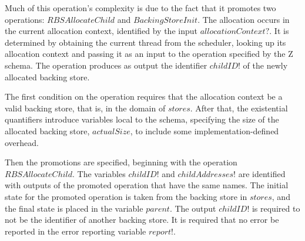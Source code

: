 \documentclass[a4paper,10pt]{report}
\begin{document}
Much of this operation's complexity is due to the fact that it promotes two
operations: $RBSAllocateChild$ and $BackingStoreInit$. The allocation occurs in
the current allocation context, identified by the input $allocationContext?$. It
is determined by obtaining the current thread from the scheduler, looking up its
allocation context and passing it as an input to the operation specified by the
Z schema.  The operation produces as output the identifier $childID!$ of the
newly allocated backing store.

The first condition on the operation requires that the allocation context be a
valid backing store, that is, in the domain of $stores$. After that, the
existential quantifiers introduce variables local to the schema, specifying the
size of the allocated backing store, $actualSize$, to include some
implementation-defined overhead.

Then the promotions are specified, beginning with the operation
$RBSAllocateChild$. The variables $childID!$ and $childAddresses!$ are
identified with outputs of the promoted operation that have the same names. The
initial state for the promoted operation is taken from the backing store in
$stores$, and the final state is placed in the variable $parent$.  The output
$childID!$ is required to not be the identifier of another backing store. It is
required that no error be reported in the error reporting variable $report!$.
\end{document}
